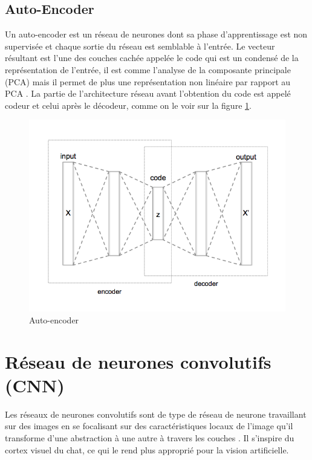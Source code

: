 \subsection{Auto-Encoder}
Un auto-encoder est un réseau de neurones dont sa phase d'apprentissage est non supervisée et chaque sortie du réseau est semblable à l'entrée. Le vecteur résultant est l'une des couches cachée appelée le code qui est un condensé de la représentation de l'entrée, il est comme l'analyse de la composante principale (PCA) mais il permet de plus une représentation non linéaire par rapport au PCA \cite{autoencoder}. La partie de l'architecture réseau avant l'obtention du code est appelé codeur et celui après le décodeur, comme on le voir sur la figure \ref{autot_encoder}.
\begin{figure}[H]
    \centering
    \includegraphics[scale = 0.5]{images/Autoencoder_structure.png}
    \caption{Auto-encoder}
    \label{autot_encoder}
\end{figure}

\section{Réseau de neurones convolutifs (CNN)}
Les réseaux de neurones convolutifs sont de type de réseau de neurone travaillant sur des images en se focalisant sur des caractéristiques locaux de l'image qu'il transforme d'une abstraction à une autre à travers les couches \cite{}. Il s'inspire du cortex visuel du chat, ce qui le rend plus approprié pour la vision artificielle.\\

